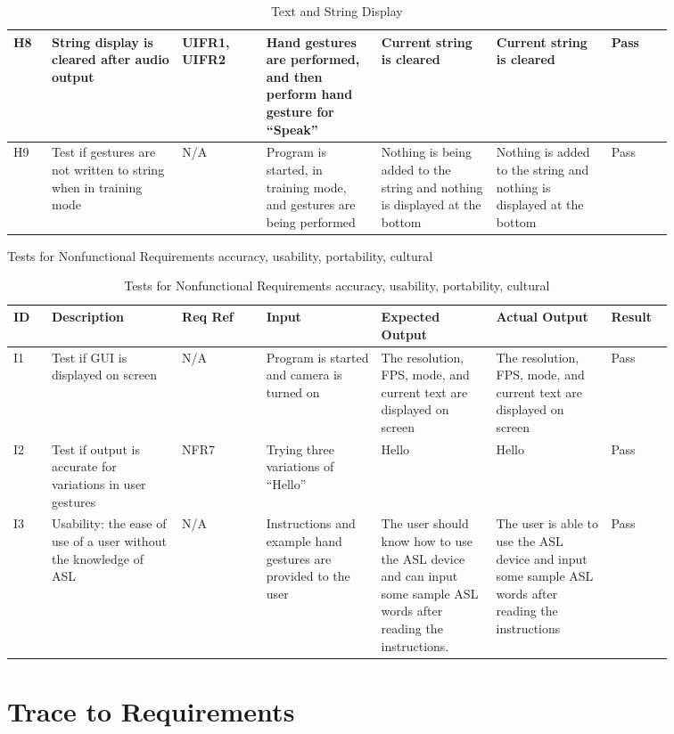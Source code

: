 \documentclass[12pt, titlepage]{article}
\begin{document}
\begin{longtable}{p{0.05\linewidth}|p{0.17\linewidth}|p{0.11\linewidth}|p{0.15\linewidth}|p{0.15\linewidth}|p{0.15\linewidth}|p{0.08\linewidth}}
H8 & String display is cleared after audio output & UIFR1, UIFR2 & Hand gestures are performed, and then perform hand gesture for “Speak” & Current string is cleared & Current string is cleared & Pass\\ \hline
H9 & Test if gestures are not written to string when in training mode & N/A & Program is started, in training mode, and gestures are being performed & Nothing is being added to the string and nothing is displayed at the bottom & Nothing is added to the string and nothing is displayed at the bottom & Pass
\hline
\caption{Text and String Display}
\end{longtable}

\newpage
\centerline{Tests for Nonfunctional Requirements accuracy, usability, portability, cultural}

\renewcommand{\arraystretch}{1.2}
\noindent \begin{longtable}{p{0.05\linewidth}|p{0.17\linewidth}|p{0.11\linewidth}|p{0.15\linewidth}|p{0.15\linewidth}|p{0.15\linewidth}|p{0.08\linewidth}}
\hline
\textbf{ID} & \textbf{Description} & \textbf{Req Ref} & \textbf{Input} & \textbf{Expected Output} & \textbf{Actual Output} & \textbf{Result}\\
\hline
I1 & Test if GUI is displayed on screen & N/A & Program is started and camera is turned on & The resolution, FPS, mode, and current text are displayed on screen & The resolution, FPS, mode, and current text are displayed on screen & Pass\\ \hline
I2 & Test if output is accurate for variations in user gestures & NFR7 & Trying three variations of “Hello” & Hello & Hello & Pass\\ \hline
I3 & Usability: the ease of use of a user without the knowledge of ASL & N/A & Instructions and example hand gestures are provided to the user & The user should know how to use the ASL device and can input some sample ASL words after reading the instructions. & The user is able to use the ASL device and input some sample ASL words after reading the instructions & Pass
\hline
\caption{Tests for Nonfunctional Requirements accuracy, usability, portability, cultural}
\end{longtable}

\section{Trace to Requirements}
\end{document}
